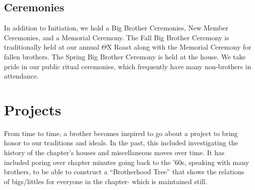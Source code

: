     \subsection*{Ceremonies}
    In addition to Initiation, we hold a Big Brother Ceremonies, New Member Ceremonies, and a Memorial Ceremony. The Fall Big Brother Ceremony is traditionally held at our annual $\Theta$X Roast along with the Memorial Ceremony for fallen brothers. The Spring Big Brother Ceremony is held at the house. We take pride in our public ritual ceremonies, which frequently have many non-brothers in attendance. 
    
  \section*{Projects}
    From time to time, a brother becomes inspired to go about a project to bring honor to our traditions and ideals. In the past, this included investigating the history of the chapter’s houses and miscellaneous moves over time. It has included poring over chapter minutes going back to the ’60s, speaking with many brothers, to be able to construct a ``Brotherhood Tree'' that shows the relations of bigs/littles for everyone in the chapter- which is maintained still.